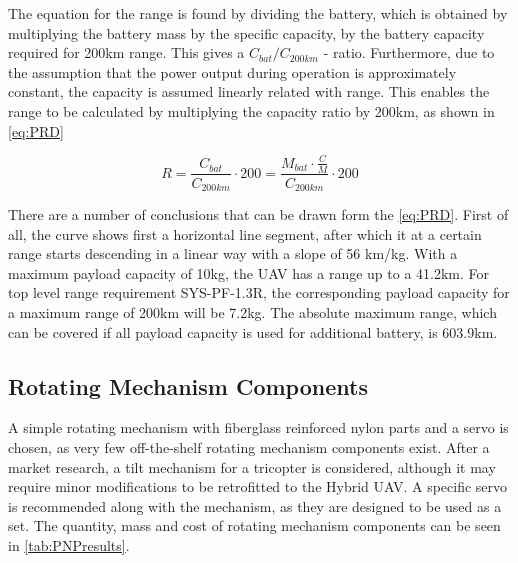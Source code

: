 {The equation for the range is found by dividing the battery, which is obtained by multiplying the battery mass by the specific capacity, by the battery capacity required for 200km range. This gives a $C_{bat}/C_{200km}$ - ratio. Furthermore, due to the assumption that the power output during operation is approximately constant, the capacity is assumed linearly related with range. This enables the range to be calculated by multiplying the capacity ratio by 200km, as shown in \autoref{eq:PRD}

\begin{equation}
\label{eq:PRD}
    R = \frac{C_{bat}}{C_{200km}} \cdot 200  =\frac{M_{bat} \cdot \frac{C}{M}}{C_{200km}} \cdot 200 
\end{equation}

There are a number of conclusions that can be drawn form the \autoref{eq:PRD}. First of all, the curve shows first a horizontal line segment, after which it at a certain range starts descending in a linear way with a slope of 56 km/kg. With a maximum payload capacity of 10kg, the UAV has a range up to a 41.2km. For top level range requirement SYS-PF-1.3R, the corresponding payload capacity for a maximum range of 200km will be 7.2kg. The absolute maximum range, which can be covered if all payload capacity is used for additional battery, is 603.9km. 



\subsection{Rotating Mechanism Components}
A simple rotating mechanism with fiberglass reinforced nylon parts and a servo is chosen, as very few off-the-shelf rotating mechanism components exist. After a market research, a tilt mechanism for a tricopter is considered, although it may require minor modifications to be retrofitted to the Hybrid UAV. A specific servo is recommended along with the mechanism, as they are designed to be used as a set. The quantity, mass and cost of rotating mechanism components can be seen in \autoref{tab:PNPresults}.

}
